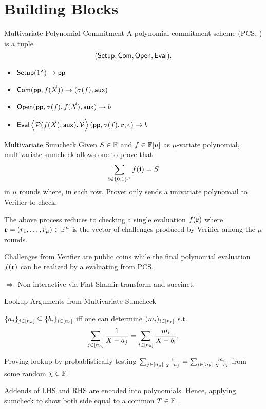 \section{Building Blocks}
\begin{frame}{Multivariate Polynomial Commitment}
	A polynomial commitment scheme (PCS, \cite{AC:KatZavGol10}) is a tuple $$(\mathsf{Setup}, \mathsf{Com}, \mathsf{Open}, \mathsf{Eval}).$$
	\begin{itemize}
		\item $ \mathsf{Setup}(1^\lambda)\to\mathsf{pp}$
		\item $\mathsf{Com}(\mathsf{pp}, f(\vec{X}))\to(\sigma(f), \mathsf{aux})$
		\item $\mathsf{Open}(\mathsf{pp}, \sigma(f), f(\vec{X}), \mathsf{aux})\to b$
		\item $ \mathsf{Eval} \left\langle\mathcal{P}( f(\vec{X}), \mathsf{aux} ),\mathcal{V}\right\rangle (\mathsf{pp}, \sigma(f), \mathbf{r}, e)\to b$
	\end{itemize}
\end{frame}
\begin{frame}{Multivariate Sumcheck}
	Given $S \in \mathbb{F}$ and $f \in \mathbb{F}[\mu]$ as $\mu$-variate polynomial, multivariate sumcheck \cite{FOCS:LundFKN90} allows one to prove that 
	\begin{equation*}
		\sum_{\mathbf{i} \in \{0,1\}^\mu} f(\mathbf{i}) = S
	\end{equation*} 
	in $\mu$ rounds where, in each row, Prover only sends a univariate polynomail to Verifier to check.
	
	The above process reduces to checking a single evaluation $f(\mathbf{r})$ where $\mathbf{r} = (r_1, \dots, r_\mu) \in \mathbb{F}^\mu$ is the vector of challenges produced by Verifier among the $\mu$ rounds.
	
	Challenges from Verifier are public coins while the final polynomial evaluation $f(\mathbf{r})$ can be realized by a evaluating from PCS.
	
	$\Rightarrow$ Non-interactive via Fiat-Shamir transform \cite{CRYPTO:FiaSha86} and succinct.
\end{frame}

\begin{frame}{Lookup Arguments from Multivariate Sumcheck}
	\begin{lemma}
		$\{a_j\}_{j \in [{n_a}]} \subseteq \{b_i\}_{i \in [{n_b}]}$ iff one can determine $(m_i)_{i \in [{n_b}]}$ s.t.
		\begin{equation*}
			\sum_{j \in [{n_a}]}\frac{1}{X - a_j} = \sum_{i \in [{n_b}]}\frac{m_i}{X - b_i}.
		\end{equation*}
	\end{lemma}
	
	Proving lookup by probablistically testing $\sum_{j \in [{n_a}]}\frac{1}{\chi - a_j} = \sum_{i \in [{n_b}]}\frac{m_i}{\chi - b_i}$ from some random $\chi \in \mathbb{F}$.
	
	Addends of LHS and RHS are encoded into polynomials. Hence, applying sumcheck to show both side equal to a common $T \in \mathbb{F}$.
\end{frame}